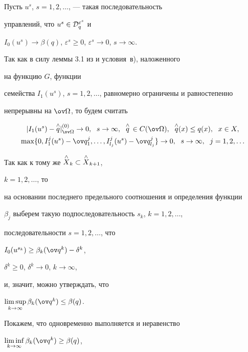 \begin{pf}


Пусть $u^s$, $s=1,2,\dotsc$, --- такая последовательность


управлений, что $u^s\in{\cal D}_q^{\varepsilon^s}$ и


$I_0(u^s)\to\beta(q)$, $\varepsilon^s\geq 0$, $\varepsilon^s\to


0$, $s\to\infty$.


Так как в силу леммы 3.1 из \cite{sumin98} и условия~в), наложенного


на функцию $G$, функции


семейства $I_1(u^s)$, $s=1,2,\dotsc$, равномерно ограничены и равностепенно


непрерывны на $\ov\Omega$, то будем считать


\begin{gather*}


|I_1(u^s)-\up{\wedge}{q}|_{\ov\Omega}^{(0)}\to


0,\ \; s\to\infty,\ \; \up{\wedge}{q}\,\in C(\ov\Omega),\ \;


\up{\wedge}{q}(x)\leq q(x),\ \; x\in X, \\


%


\max\{0,I^j_1(u^s)-\ov q^j_1,\dotsc,I^j_{l_j}(u^s)-\ov q^j_{l_j}\}


\to 0,\ \; s\to\infty,\ \; j=1,2,\dotsc


\end{gather*}


Так как к тому же $\overset{\wedge}{X}{}_k\subset\overset{\wedge}{X}{}_{k+1}$,


$k=1,2,\dotsc$, то


на основании последнего предельного соотношения и определения функции


$\beta_j$ выберем такую подпоследовательность $s_k$, $k=1,2,\dotsc$,


последовательности $s=1,2,\dotsc$, что


$I_0(u^{s_k})\geq\beta_k(\ov q^k)-\delta^k$,


$\delta^k\geq 0$, $\delta^k\to 0$, $k\to\infty$,


и, значит, можно утверждать, что


$\limsup\limits_{k\to\infty}\beta_k(\ov q^k)\leq\beta(q)$.


Покажем, что одновременно выполняется и неравенство


$\liminf\limits_{k\to\infty}\beta_k(\ov q^k)\geq\beta(q)$,



\end{pf}
